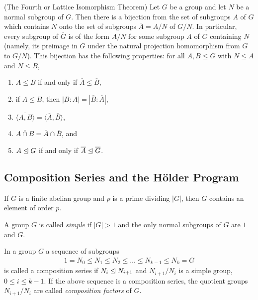 \documentclass[../main]{subfiles}
\begin{document}
  
  \begin{thm}
   (The Fourth or Lattice Isomorphism Theorem) Let $G$ be a group and let $N$ be a normal subgroup of $G$. Then there is a bijection from the set of subgroups $A$ of $G$ which contains $N$ onto the set of subgroups $\overline{A} = A/N$ of $G/N$. In particular, every subgroup of $\overline{G}$ is of the form $A/N$ for some subgroup $A$ of $G$ containing $N$ (namely, its preimage in $G$ under the natural projection homomorphism from $G$ to $G/N$). This bijection has the following properties: for all $A,B\leq G$ with $N\leq A$ and $N\leq B$,
   \begin{enumerate}
    \item $A\leq B$ if and only if $\overline{A} \leq \overline{B}$,
    \item if $A\leq B$, then $|B:A| = |\overline{B}:\overline{A}|$,
    \item $\overline{\langle A,B \rangle} = \langle \overline{A},\overline{B} \rangle$,
    \item $\overline{A\cap B} = \overline{A} \cap \overline{B}$, and 
    \item $A \trianglelefteq G$ if and only if $\overline{A} \trianglelefteq \overline{G}$.
   \end{enumerate}
  \end{thm}
  
  
  \subsection{Composition Series and the H\"{o}lder Program}
  
  
  \begin{prop}
   If $G$ is a finite abelian group and $p$ is a prime dividing $|G|$, then $G$ contains an element of order $p$.
  \end{prop}
  
  
  \begin{dfn}
   A group $G$ is called \textit{simple} if $|G| > 1$ and the only normal subgroups of $G$ are $1$ and $G$.
  \end{dfn}
  
  
  \begin{dfn}
   In a group $G$ a sequence of subgroups 
   \begin{align*}
    1 = N_0 \leq N_1 \leq N_2 \leq \ldots \leq N_{k-1} \leq N_k = G
   \end{align*}
   is called a composition series if $N_i \trianglelefteq N_{i+1}$ and $N_{i+1}/N_i$ is a simple group, $0\leq i\leq k-1$. If the above sequence is a composition series, the quotient groups $N_{i+1}/N_i$ are called \textit{composition factors} of $G$.
  \end{dfn}
  
\end{document}
